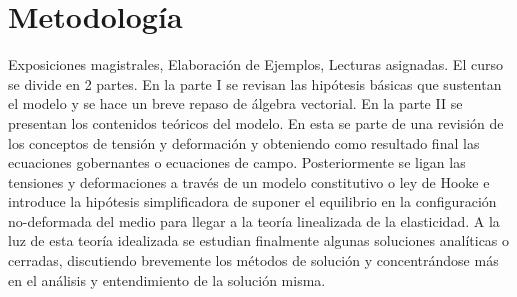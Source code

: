 \section*{Metodología}
Exposiciones magistrales, Elaboración de Ejemplos, Lecturas asignadas. El curso 
se divide en 2 partes.  En la parte I se revisan las hipótesis básicas que 
sustentan el modelo y se hace un breve repaso de álgebra vectorial. En la parte 
II se presentan los contenidos teóricos del modelo. En esta se parte de una 
revisión de los conceptos de tensión y deformación y obteniendo como resultado 
final las ecuaciones gobernantes o ecuaciones de campo.  Posteriormente se 
ligan las tensiones y deformaciones a través de un modelo constitutivo o ley de 
Hooke e introduce la hipótesis simplificadora de suponer el equilibrio en la 
configuración no-deformada del medio para llegar a la teoría linealizada de la 
elasticidad.  A la luz de esta teoría idealizada se estudian finalmente algunas 
soluciones analíticas o cerradas, discutiendo brevemente los métodos de 
solución y concentrándose más en el análisis y entendimiento de la solución 
misma.

\pagebreak

